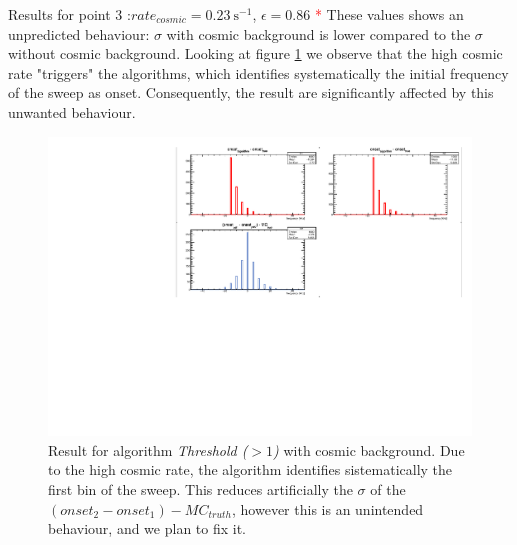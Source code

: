 \documentclass[8pt]{beamer}
\begin{document}
\begin{frame}{Results for point 3 :$rate_{cosmic} = \SI{0.23}{\second \tothe{-1}}$, $\epsilon = 0.86$}
\textcolor{red}{*} These values shows an unpredicted behaviour: $\sigma$ with cosmic background is lower compared to the $\sigma$ without cosmic background. Looking at figure \ref{fig:HighCosmicError} we observe that the high cosmic rate "triggers" the algorithms, which identifies systematically the initial frequency of the sweep as onset. Consequently, the result are significantly affected by this unwanted behaviour.    

\end{frame}

\begin{frame}

\begin{figure}[hbtp]
\centering
\includegraphics[width = \textwidth]{../LineShape/Plot/point3/Threshold_1.pdf}
\caption{Result for algorithm \textit{Threshold ($> 1$)} with cosmic background. Due to the high cosmic rate, the algorithm identifies sistematically the first bin of the sweep. This reduces artificially the $\sigma$ of the $(onset_{2} - onset_{1}) - MC_{truth}$, however this is an unintended behaviour, and we plan to fix it.}
\label{fig:HighCosmicError}
\end{figure}


\end{frame}
\end{document}
